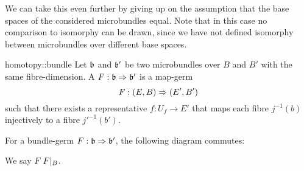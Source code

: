 \begin{myparagraph}
    We can take this even further by giving up on the assumption that the base spaces of the considered microbundles equal.
    Note that in this case no comparison to isomorphy can be drawn,
    since we have not defined isomorphy between microbundles over different base spaces.
\end{myparagraph}

\begin{mydefinition}{homotopy::bundle}
    Let $\mathfrak{b}$ and $\mathfrak{b}'$ be two microbundles over $B$ and $B'$ with the same fibre-dimension.
    A  $F: \mathfrak{b} \Rightarrow{} \mathfrak{b}'$ is a map-germ
    \[ F: (E, B) \Rightarrow{} (E', B') \]
    such that there exists a representative $f: U_f \to E'$ that maps each fibre $j^{-1}(b)$ injectively to a fibre $j'^{-1}(b')$.
\end{mydefinition}

\begin{myparagraph}
    For a bundle-germ $F: \mathfrak{b} \Rightarrow{} \mathfrak{b}'$, the following diagram commutes:
    \begin{center}
    \end{center}
    We say $F$  $F\vert_{B}$.
\end{myparagraph}